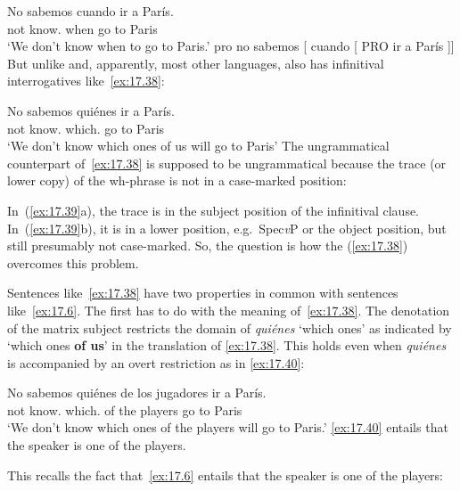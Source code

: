 \documentclass[output=paper]{langsci/langscibook}
\begin{document}
\ea\label{ex:17.37}
    \ea
    \gll    No sabemos cuando ir a París.\\
            not know.\Fpl{} when  go to Paris    \\
    \glt    ‘We don’t know when to go to Paris.’
    \ex     pro no sabemos [ cuando [ PRO  ir a París ]]
    \z
\z
But unlike  and, apparently, most other languages,  also has
infinitival interrogatives like~\eqref{ex:17.38}:

\ea\label{ex:17.38}
    \gll    No sabemos quiénes ir a París.\\
            not  know.\Fpl{} which.\Pl{} go to Paris\\
    \glt    ‘We don’t know which ones of us will go to Paris’
\z
The ungrammatical  counterpart of~\eqref{ex:17.38} is supposed to be
ungrammatical because the trace (or lower copy) of the wh-phrase is not in a
case-marked position:

\ea\label{ex:17.39}
    \z
\z
In~(\ref{ex:17.39}a), the trace is in the subject position of the infinitival
clause. In~(\ref{ex:17.39}b), it is in a lower position, e.g.\ Spec\emph{v}P
or the object position, but still presumably not case-marked. So, the question
is how the  (\ref{ex:17.38}) overcomes this problem.

Sentences like~\eqref{ex:17.38} have two properties in common with
sentences like~\eqref{ex:17.6}. The first has to do with the meaning
of~\eqref{ex:17.38}.  The denotation of the matrix subject restricts the
domain of \emph{quiénes} ‘which ones’ as indicated by ‘which ones \textbf{of
us}’ in the translation of \eqref{ex:17.38}. This holds even when
\emph{quiénes} is accompanied by an overt restriction as in
\eqref{ex:17.40}:

\ea\label{ex:17.40}
    \gll    No sabemos quiénes de los jugadores ir a París.\\
            not know.\Fpl{} which.\Pl{} of the players go to Paris\\
    \glt    ‘We don’t know which ones of the players will go to Paris.’
\z
\eqref{ex:17.40} entails that the speaker is one of the players.

This recalls the fact that~\eqref{ex:17.6} entails that the speaker is one of
the players:
\end{document}
